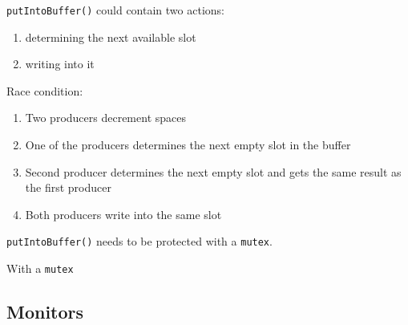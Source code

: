 \begin{frame}%
  \begin{block}{\texttt{putIntoBuffer()} could contain two actions:}
    \begin{enumerate}
    \item determining the next available slot
    \item writing into it
    \end{enumerate}
  \end{block}
  \begin{block}{Race condition:}
    \begin{enumerate}
    \item Two producers decrement spaces
    \item One of the producers determines the next empty slot in the buffer
    \item Second producer determines the next empty slot and gets the same result as the
      first producer
    \item Both producers write into the same slot
    \end{enumerate}
  \end{block}
  \texttt{putIntoBuffer()} needs to be protected with a \texttt{mutex}.
\end{frame}

\begin{frame}{With a \texttt{mutex}}%
  \begin{center}
     
  \end{center}
\end{frame}

\subsection{Monitors}
\label{sec:monitors}


